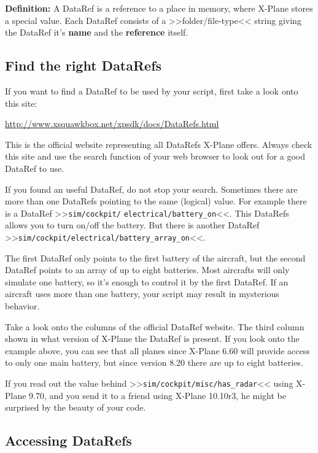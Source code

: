 \documentclass[11pt,parskip=half,a4paper]{scrartcl}
\begin{document}
\vspace{2ex}

\textbf{Definition:} A DataRef is a reference to a place in memory, where X-Plane stores a special value. Each DataRef consists of a >>folder/file-type<< string giving the DataRef it's \textbf{name} and the \textbf{reference} itself.

\vspace{2ex}

\subsection{Find the right DataRefs}

If you want to find a DataRef to be used by your script, first take a look onto this site:

\url{http://www.xsquawkbox.net/xpsdk/docs/DataRefs.html}

This is the official website representing all DataRefs X-Plane offers. Always check this site and use the search function of your web browser to look out for a good DataRef to use.

If you found an useful DataRef, do not stop your search. Sometimes there are more than one DataRefs pointing to the same (logical) value. For example there is a DataRef >>\verb|sim/cockpit/| \verb|electrical/battery_on|<<. This DataRefs allows you to turn on/off the battery. But there is another DataRef >>\verb|sim/cockpit/electrical/battery_array_on|<<.

The first DataRef only points to the first battery of the aircraft, but the second DataRef points to an array of up to eight batteries. Most aircrafts will only simulate one battery, so it's enough to control it by the first DataRef. If an aircraft uses more than one battery, your script may result in mysterious behavior.

Take a look onto the columns of the official DataRef website. The third column shown in what version of X-Plane the DataRef is present. If you look onto the example above, you can see that all planes since X-Plane 6.60 will provide access to only one main battery, but since version 8.20 there are up to eight batteries.

If you read out the value behind >>\verb|sim/cockpit/misc/has_radar|<< using X-Plane 9.70, and you send it to a friend using X-Plane 10.10r3, he might be surprised by the beauty of your code.

\subsection{Accessing DataRefs}
\end{document}
